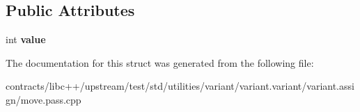 \subsection*{Public Attributes}
\begin{DoxyCompactItemize}
\item 
\mbox{\label{struct_t_move_assign_n_t_copy_assign_ae1e4e77b3298efc9be5eeb8a188335eb}} 
int {\bfseries value}
\end{DoxyCompactItemize}


The documentation for this struct was generated from the following file\+:\begin{DoxyCompactItemize}
\item 
contracts/libc++/upstream/test/std/utilities/variant/variant.\+variant/variant.\+assign/move.\+pass.\+cpp\end{DoxyCompactItemize}
